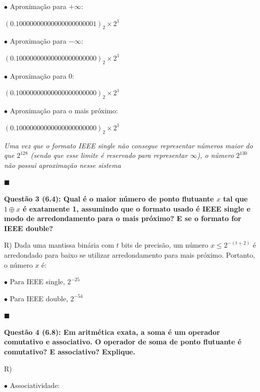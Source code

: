 \documentclass{article}
\begin{document}
\bigskip\bigskip
{}

\qquad$\bullet$ Aproximação para $+\infty$:

\qquad\qquad$(0.10000000000000000000001)_{2} \times 2^{1}$

\bigskip
\qquad$\bullet$ Aproximação para $-\infty$:

\qquad\qquad$(0.10000000000000000000000)_{2} \times 2^{1}$

\bigskip
\qquad$\bullet$ Aproximação para $0$:

\qquad\qquad$(0.10000000000000000000000)_{2} \times 2^{1}$

\bigskip
\qquad$\bullet$ Aproximação para o mais próximo:

\qquad\qquad$(0.10000000000000000000000)_{2} \times 2^{1}$

\bigskip\bigskip
\qquad [Para $2^{130}$]

\qquad\emph{Uma vez que o formato IEEE single não consegue representar números maior do que $2^{128}$ (sendo que esse limite é reservado para representar $\infty$), o número $2^{130}$ não possui aproximação nesse sistema}

\begin{flushright}
$\blacksquare$
\end{flushright}

\bigskip
\textbf{Questão 3 (6.4): Qual é o maior número de ponto flutuante $x$ tal que $1 \oplus x$ é exatamente 1, assumindo que o formato usado é IEEE single e modo de arredondamento para o mais próximo? E se o formato for IEEE double?}

\bigskip
\quad R) Dada uma mantissa binária com $t$ bits de precisão, um número $x \leqslant 2^{-(t+2)}$  é arredondado para baixo se utilizar arredondamento para mais próximo. Portanto, o número $x$ é:

\bigskip
\qquad$\bullet$ Para IEEE single, $2^{-25}$

\qquad$\bullet$ Para IEEE double, $2^{-54}$

\begin{flushright}
$\blacksquare$
\end{flushright}

\bigskip
\textbf{Questão 4 (6.8): Em aritmética exata, a soma é um operador comutativo e associativo. O operador de soma de ponto flutuante é comutativo? E associativo? Explique.}

\bigskip
\quad R)

\qquad$\bullet$ Associatividade:
\end{document}

